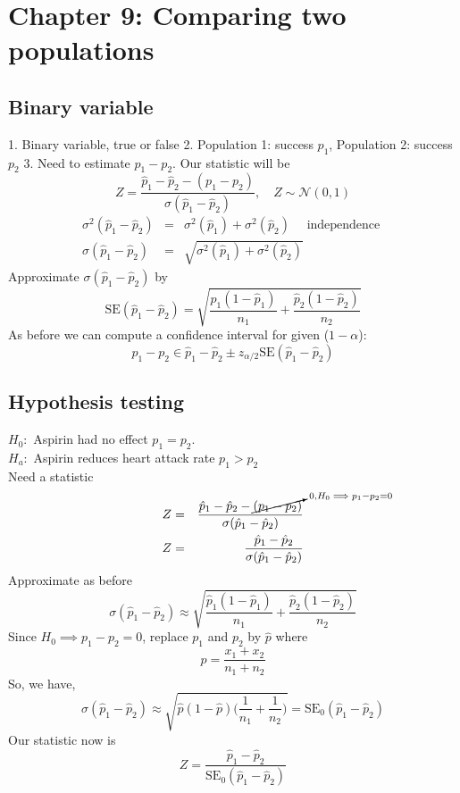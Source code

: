 \documentclass{article}
\newcommand{\beq}{\begin{equation}}
\newcommand{\eeq}{\end{equation}}
\newcommand{\ber}{\begin{eqnarray}}
\newcommand{\eer}{\end{eqnarray}}
\begin{document}
\section{Chapter 9: Comparing two populations}
\subsection{Binary variable}
1. Binary variable, true or false
2. Population 1: success $p_1$, Population 2: success $p_2$
3. Need to estimate $p_1-p_2$.
Our statistic will be
\beq
Z = \frac{\hat{p}_1-\hat{p}_2 - (p_1-p_2)}{\sigma(\hat{p}_1-\hat{p}_2)}, \quad Z \sim \mathcal{N}(0,1)
\eeq
\ber
\sigma^2(\hat{p}_1-\hat{p}_2) &=& \sigma^2(\hat{p}_1) + \sigma^2(\hat{p}_2) \quad \text{ independence } \\
\sigma(\hat{p}_1-\hat{p}_2) &=& \sqrt{\sigma^2(\hat{p}_1) + \sigma^2(\hat{p}_2)}
\eer
Approximate $\sigma(\hat{p}_1-\hat{p}_2)$ by
\beq
\text{SE}(\hat{p}_1-\hat{p}_2) = \sqrt{\frac{\hat{p}_1(1-\hat{p}_1)}{n_1} + \frac{\hat{p}_2(1-\hat{p}_2)}{n_2}}
\eeq
As before we can compute a confidence interval for given ($1-\alpha$):
\beq
p_1 - p_2 \in \hat{p}_1-\hat{p}_2 \pm z_{\alpha/2}\text{SE}(\hat{p}_1-\hat{p}_2) 
\eeq
\subsection{Hypothesis testing}
$H_0:$ Aspirin had no effect $p_1=p_2$.\\
$H_a:$ Aspirin reduces heart attack rate $p_1>p_2$\\
Need a statistic
\ber
Z &=& \frac{\hat{p}_1-\hat{p}_2 - \cancelto{0, H_0 \implies p_1-p_2=0}{(p_1-p_2)}}{\sigma(\hat{p}_1-\hat{p}_2)} \\
Z &=& \frac{\hat{p}_1-\hat{p}_2}{\sigma(\hat{p}_1-\hat{p}_2)} 
\eer
Approximate as before
\beq
\sigma(\hat{p}_1-\hat{p}_2) \approx  \sqrt{\frac{\hat{p}_1(1-\hat{p}_1)}{n_1} + \frac{\hat{p}_2(1-\hat{p}_2)}{n_2}}
\eeq
Since $H_0 \implies p_1-p_2=0$, replace $p_1$ and $p_2$ by $\hat{p}$ where
\beq
\hat{p} = \frac{x_1+x_2}{n_1+n_2}
\eeq
So, we have,
\beq
\sigma(\hat{p}_1-\hat{p}_2) \approx \sqrt{\hat{p}(1-\hat{p})\Big(\frac{1}{n_1} + \frac{1}{n_2}\Big)} = \text{SE}_0(\hat{p}_1-\hat{p}_2)    
\eeq
Our statistic now is
\beq
Z = \frac{\hat{p}_1 - \hat{p}_2}{\text{SE}_0(\hat{p}_1-\hat{p}_2)}
\eeq
\end{document}
